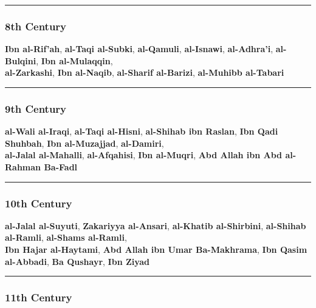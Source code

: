 \documentclass[
  a4paper,
  DIV=11,
  numbers=noendperiod]{scrartcl}
\begin{document}
\begin{center}\rule{0.5\linewidth}{0.5pt}\end{center}

\subsubsection{8th Century}\label{th-century-4}

\textbf{Ibn al-Rif'ah}, \textbf{al-Taqi al-Subki}, \textbf{al-Qamuli},
\textbf{al-Isnawi}, \textbf{al-Adhra'i}, \textbf{al-Bulqini},
\textbf{Ibn al-Mulaqqin},\\
\textbf{al-Zarkashi}, \textbf{Ibn al-Naqib}, \textbf{al-Sharif
al-Barizi}, \textbf{al-Muhibb al-Tabari}

\begin{center}\rule{0.5\linewidth}{0.5pt}\end{center}

\subsubsection{9th Century}\label{th-century-5}

\textbf{al-Wali al-Iraqi}, \textbf{al-Taqi al-Hisni}, \textbf{al-Shihab
ibn Raslan}, \textbf{Ibn Qadi Shuhbah}, \textbf{Ibn al-Muzajjad},
\textbf{al-Damiri},\\
\textbf{al-Jalal al-Mahalli}, \textbf{al-Afqahisi}, \textbf{Ibn
al-Muqri}, \textbf{Abd Allah ibn Abd al-Rahman Ba-Fadl}

\begin{center}\rule{0.5\linewidth}{0.5pt}\end{center}

\subsubsection{10th Century}\label{th-century-6}

\textbf{al-Jalal al-Suyuti}, \textbf{Zakariyya al-Ansari},
\textbf{al-Khatib al-Shirbini}, \textbf{al-Shihab al-Ramli},
\textbf{al-Shams al-Ramli},\\
\textbf{Ibn Hajar al-Haytami}, \textbf{Abd Allah ibn Umar Ba-Makhrama},
\textbf{Ibn Qasim al-Abbadi}, \textbf{Ba Qushayr}, \textbf{Ibn Ziyad}

\begin{center}\rule{0.5\linewidth}{0.5pt}\end{center}

\subsubsection{11th Century}\label{th-century-7}
\end{document}
